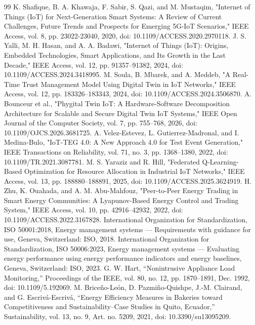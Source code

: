 \documentclass{ieeeaccess}
\begin{document}
\begin{thebibliography}{99}
 K. Shafique, B. A. Khawaja, F. Sabir, S. Qazi, and M. Mustaqim, "Internet of Things (IoT) for Next-Generation Smart Systems: A Review of Current Challenges, Future Trends and Prospects for Emerging 5G-IoT Scenarios," IEEE Access, vol. 8, pp. 23022-23040, 2020, doi: 10.1109/ACCESS.2020.2970118.
 J. S. Yalli, M. H. Hasan, and A. A. Badawi, "Internet of Things (IoT): Origins, Embedded Technologies, Smart Applications, and Its Growth in the Last Decade," IEEE Access, vol. 12, pp. 91357--91382, 2024, doi: 10.1109/ACCESS.2024.3418995.
 M. Soula, B. Mbarek, and A. Meddeb, "A Real-Time Trust Management Model Using Digital Twin in IoT Networks," IEEE Access, vol. 12, pp. 183326--183343, 2024, doi: 10.1109/ACCESS.2024.3506870.
 A. Bounceur et al., "Phygital Twin IoT: A Hardware-Software Decomposition Architecture for Scalable and Secure Digital Twin IoT Systems," IEEE Open Journal of the Computer Society, vol. 7, pp. 755--768, 2026, doi: 10.1109/OJCS.2026.3681725.
 A. Velez-Estevez, L. Gutierrez-Madronal, and I. Medina-Bulo, "IoT-TEG 4.0: A New Approach 4.0 for Test Event Generation," IEEE Transactions on Reliability, vol. 71, no. 3, pp. 1368--1380, 2022, doi: 10.1109/TR.2021.3087781.
 M. S. Yaraziz and R. Hill, "Federated Q-Learning-Based Optimization for Resource Allocation in Industrial IoT Networks," IEEE Access, vol. 13, pp. 188880--188891, 2025, doi: 10.1109/ACCESS.2025.3624919.
 H. Zhu, K. Ouahada, and A. M. Abu-Mahfouz, "Peer-to-Peer Energy Trading in Smart Energy Communities: A Lyapunov-Based Energy Control and Trading System," IEEE Access, vol. 10, pp. 42916--42932, 2022, doi: 10.1109/ACCESS.2022.3167828.
 International Organization for Standardization, ISO 50001:2018, Energy management systems --- Requirements with guidance for use, Geneva, Switzerland: ISO, 2018.
 International Organization for Standardization, ISO 50006:2023, Energy management systems --- Evaluating energy performance using energy performance indicators and energy baselines, Geneva, Switzerland: ISO, 2023.
 G. W. Hart, ``Nonintrusive Appliance Load Monitoring,'' Proceedings of the IEEE, vol. 80, no. 12, pp. 1870--1891, Dec. 1992, doi: 10.1109/5.192069.
 M. Briceño-León, D. Pazmiño-Quishpe, J.-M. Clairand, and G. Escrivá-Escrivá, ``Energy Efficiency Measures in Bakeries toward Competitiveness and Sustainability--Case Studies in Quito, Ecuador,'' Sustainability, vol. 13, no. 9, Art. no. 5209, 2021, doi: 10.3390/su13095209.

\end{thebibliography}
\end{document}
